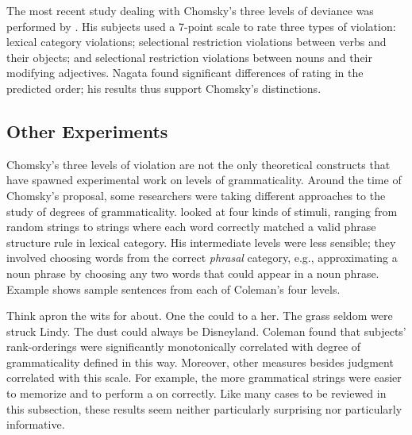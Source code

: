 The most recent study dealing with Chomsky's three levels of deviance was performed by \citet{Nagata1990b}. His subjects used a 7-point scale to rate three types of violation: lexical category violations; selectional restriction violations between verbs and their objects; and selectional restriction violations between nouns and their modifying adjectives. Nagata found significant differences of rating in the predicted  order; his results thus support Chomsky's distinctions.

\subsection{Other Experiments}\label{sec:3.3.3}

Chomsky's three levels of violation are not the only theoretical constructs that have spawned experimental work on levels of grammaticality. Around the time of Chomsky's proposal, some researchers were taking different approaches to the
study of degrees of grammaticality. \citet{Coleman1965} looked at four kinds of stimuli, ranging from random strings to strings where each word correctly matched a valid phrase structure rule in lexical category. His intermediate levels were less
sensible; they involved choosing words from the correct \textit{phrasal} category, e.g., approximating a noun phrase by choosing any two words that could appear in a noun phrase. Example  shows sample sentences from each of Coleman's four levels.

\ea \label{ex:3:7}
\ea Think apron the wits for about. 
\ex One the could to a her.
\ex The grass seldom were struck Lindy.
\ex The dust could always be Disneyland.
\z
\z
\noindent
Coleman found that subjects' rank-orderings were significantly monotonically correlated with degree of grammaticality defined in this way. Moreover, other measures besides judgment correlated with this scale. For example, the more grammatical strings were easier to memorize and to perform a  on correctly. Like many cases to be reviewed in this subsection, these results seem neither particularly surprising nor particularly informative.


